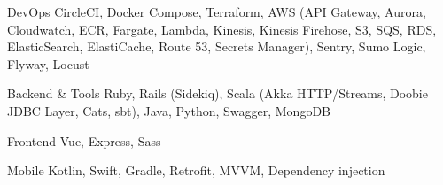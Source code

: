 \begin{cvskills}

    \cvskill
      {DevOps} %
      {
        CircleCI, Docker Compose, Terraform, 
        AWS (API Gateway, Aurora, Cloudwatch, ECR, \newline Fargate, Lambda, Kinesis, Kinesis Firehose, S3, SQS, RDS, ElasticSearch, ElastiCache, \newline Route 53, Secrets Manager), 
        Sentry, Sumo Logic, Flyway, Locust
      } %

    \cvskill
      {Backend \& Tools} %
      {Ruby, Rails (Sidekiq), Scala (Akka HTTP/Streams, Doobie JDBC Layer, Cats, sbt), Java, \newline Python, Swagger, MongoDB} %

    \cvskill
      {Frontend} %
      {Vue, Express, Sass} %

    \cvskill
      {Mobile} %
      {Kotlin, Swift, Gradle, Retrofit, MVVM, Dependency injection} %
\end{cvskills}
